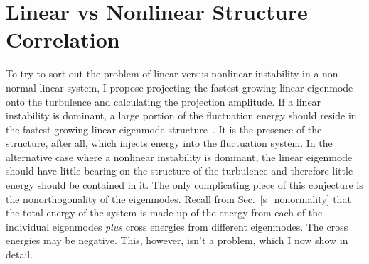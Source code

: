 \section{Linear vs Nonlinear Structure Correlation}
\label{s_lin_vs_nlin_struc}

To try to sort out the problem of linear versus nonlinear instability in a non-normal linear system, I propose projecting the fastest growing linear eigenmode onto the turbulence and calculating
the projection amplitude. If a linear instability is dominant, a large portion of the fluctuation energy should reside in the fastest growing linear eigenmode structure~\cite{hatch2011}. 
It is the presence of the structure, after all, which injects energy into the fluctuation system. In the alternative case where a nonlinear instability is dominant, 
the linear eigenmode should have little bearing on the structure of the turbulence and therefore little energy should be contained in it. 
The only complicating piece of this conjecture is the nonorthogonality of the eigenmodes. Recall from Sec.~\ref{s_nonormality} that the total energy of the system is made up of the energy from
each of the individual eigenmodes \emph{plus} cross energies from different eigenmodes. The cross energies may be negative. This, however, isn't a problem, which I now show in detail.

